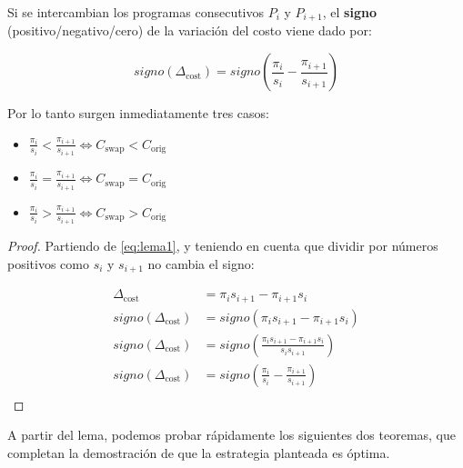 \documentclass{article}
\begin{document}
\begin{lema}
Si se intercambian los programas consecutivos $P_i$ y $P_{i+1}$, el \textbf{signo} (positivo/negativo/cero) de la variación del costo viene dado por:

$$signo \left (\Delta_{\mbox{cost}} \right ) = signo\left (\frac{\pi_i}{s_i} - \frac{\pi_{i+1}}{s_{i+1}} \right)$$

Por lo tanto surgen inmediatamente tres casos:
\begin{itemize}
\item $\frac{\pi_i}{s_i} < \frac{\pi_{i+1}}{s_{i+1}} \Leftrightarrow C_{\mbox{swap}} < C_{\mbox{orig}}$
\item $\frac{\pi_i}{s_i} = \frac{\pi_{i+1}}{s_{i+1}} \Leftrightarrow C_{\mbox{swap}} = C_{\mbox{orig}}$
\item $\frac{\pi_i}{s_i} > \frac{\pi_{i+1}}{s_{i+1}} \Leftrightarrow C_{\mbox{swap}} > C_{\mbox{orig}}$
\end{itemize}

\end{lema}
\begin{proof}
Partiendo de \ref{eq:lema1}, y teniendo en cuenta que dividir por números positivos como $s_i$ y $s_{i+1}$ no cambia el signo:

\begin{align*}
\Delta_{\mbox{cost}} &= \pi_{i}s_{i+1} - \pi_{i+1}s_i \\
signo \left(\Delta_{\mbox{cost}} \right) &= signo \left (\pi_{i}s_{i+1} - \pi_{i+1}s_i \right) \\
signo \left(\Delta_{\mbox{cost}} \right) &= signo \left (\frac{\pi_{i}s_{i+1} - \pi_{i+1}s_i}{s_i s_{i+1}} \right) \\
signo \left(\Delta_{\mbox{cost}} \right) &= signo \left (\frac{\pi_{i}}{s_i} - \frac{\pi_{i+1}}{s_{i+1}} \right) \\
\end{align*}

\end{proof}

A partir del lema, podemos probar rápidamente los siguientes dos teoremas, que completan la demostración de que la estrategia planteada es óptima.

\newtheorem{teorema}{Teorema}
\end{document}
